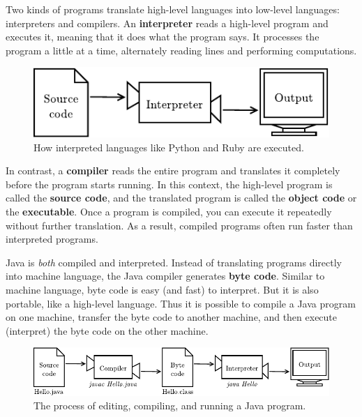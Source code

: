 \documentclass[12pt]{book}
\theoremstyle{exercise}
\begin{document}

Two kinds of programs translate high-level languages into low-level languages: interpreters and compilers.
An {\bf interpreter} reads a high-level program and executes it, meaning that it does what the program says.
It processes the program a little at a time, alternately reading lines and performing computations.

\begin{figure}[!h]
\begin{center}
\includegraphics{figs/interpreter.pdf}
\caption{How interpreted languages like Python and Ruby are executed.}
\end{center}
\end{figure}


In contrast, a {\bf compiler} reads the entire program and translates it completely before the program starts running.
In this context, the high-level program is called the {\bf source code}, and the translated program is called the {\bf object code} or the {\bf executable}.
Once a program is compiled, you can execute it repeatedly without further translation.
As a result, compiled programs often run faster than interpreted programs.


Java is {\em both} compiled and interpreted.
Instead of translating programs directly into machine language, the Java compiler generates {\bf byte code}.
Similar to machine language, byte code is easy (and fast) to interpret.
But it is also portable, like a high-level language.
Thus it is possible to compile a Java program on one machine, transfer the byte code to another machine, and then execute (interpret) the byte code on the other machine.

\begin{figure}[!h]
\begin{center}
\includegraphics{figs/compiler.pdf}
\caption{The process of editing, compiling, and running a Java program.}
\end{center}
\end{figure}
\end{document}
